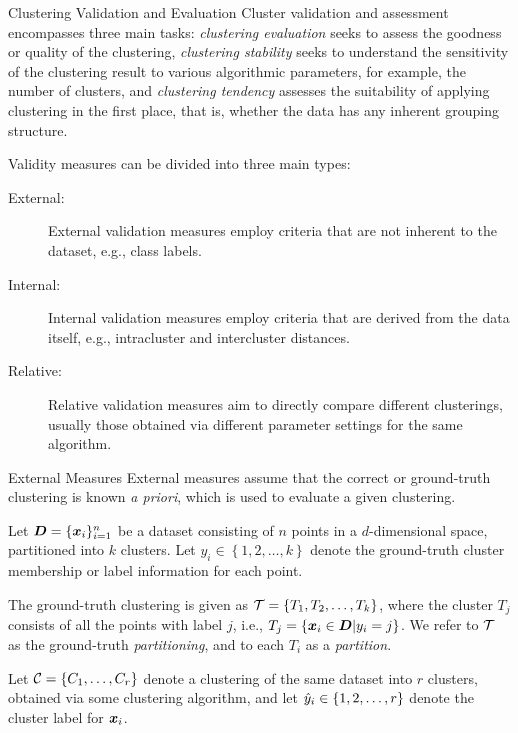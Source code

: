 
\date{Chapter 17: Clustering Validation}
\newcommand{\NMI}{\mathit{NMI}}
\newcommand{\VI}{\mathit{VI}}

\begin{frame}
\titlepage
\end{frame}


\begin{frame}{Clustering Validation and Evaluation}
Cluster validation and assessment encompasses three main tasks:
{\em clustering
evaluation} seeks to assess the goodness or quality of the clustering,
{\em clustering stability} seeks to understand the sensitivity of the clustering result to various algorithmic parameters,
for example, the number of clusters,
and {\em clustering tendency} assesses
the suitability of applying clustering in the f\/{i}rst place, that is, whether
the data has any inherent grouping structure.

\bigskip
Validity measures can be divided into three main types:

\begin{description}

\item [External:] External validation measures employ criteria that are
  not inherent to the dataset, e.g., class labels. 

\item [Internal:] Internal validation measures employ criteria that are
  derived from the data itself, e.g., intracluster
  and intercluster distances.

\item [Relative:] Relative validation measures aim to directly compare
  different clusterings, usually those
  obtained via different parameter settings for the same algorithm.
\end{description}
\end{frame}



\begin{frame}{External Measures}
External measures assume that the correct or
ground-truth clustering is known {\it a priori}, which 
is used to evaluate a
given clustering.  

\medskip
Let ${\boldsymbol D} = \{{\boldsymbol x}_i\}_{i=1}^n$ be a dataset consisting of $n$ points in a
$d$-dimensional space, partitioned into $k$ clusters.  Let $y_i \in
\left\{ 1, 2,\ldots , k \right\}$ denote the ground-truth cluster
membership or label information for each point.  

\medskip
The ground-truth
clustering is given as 
${\mathcal T} = \left\{ T_1, T_2, \ldots, T_k \right\}$,
where the cluster $T_{j}$ consists of all the points with label $j$, 
i.e.,
$T_{j} = \left\{ {\boldsymbol x}_i \in {\boldsymbol D} | y_i = j \right\}$.  
We refer to ${\mathcal T}$ as the ground-truth {\em
partitioning}, and to each $T_i$ as a {\em partition}.



\medskip
Let ${\mathcal C}=\{C_1,
\ldots, C_r\}$ denote a clustering of the same dataset into $r$
clusters, obtained via some clustering algorithm, and let $\hat{y}_i \in
\left\{ 1, 2, \ldots, r \right\}$ denote the cluster label for ${\boldsymbol x}_i$.
\end{frame}


